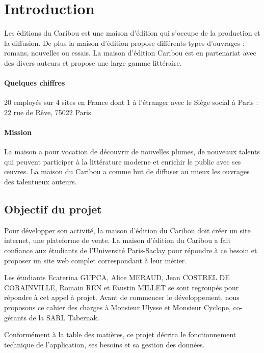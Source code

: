 \documentclass[14pt]{extarticle}
\begin{document}
\renewcommand\labelitemi{--}
\section{Introduction}
Les éditions du Caribou est une maison d'édition qui s'occupe de la production et la diffusion.
De plus la maison d'édition propose différents types d'ouvrages : romans, nouvelles ou essais.
La maison d'édition Caribou est en partenariat avec des divers auteurs et propose une large gamme littéraire.

\paragraph{Quelques chiffres}
20 employés sur 4 sites en France dont 1 à l’étranger avec le Siège social à Paris : 22 rue de Rêve, 75022 Paris.

\paragraph{Mission}
La maison a pour vocation de découvrir de nouvelles plumes, de nouveaux talents qui peuvent participer à la littérature moderne et enrichir le public avec ses œuvres. La maison du Caribou a comme but de diffuser au mieux les ouvrages des talentueux auteurs.
\subsection{Objectif du projet}
Pour développer son activité, la maison d'édition du Caribou doit créer un site internet, une plateforme de vente. La maison d'édition du Caribou a fait confiance aux étudiants de l'Université Paris-Saclay pour répondre à ce besoin et proposer un site web complet correspondant à leur métier.

Les étudiants Ecaterina GUPCA, Alice MERAUD, Jean COSTREL DE CORAINVILLE, Romain REN et Faustin MILLET se sont regroupés pour répondre à cet appel à projet. Avant de commencer le développement, nous proposons ce cahier des charges à Monsieur Ulysse et Monsieur Cyclope, co-gérants de la SARL Tabernak.

Conformément à la table des matières, ce projet décrira le fonctionnement technique de l'application, ses besoins et sa gestion des données.
\end{document}
